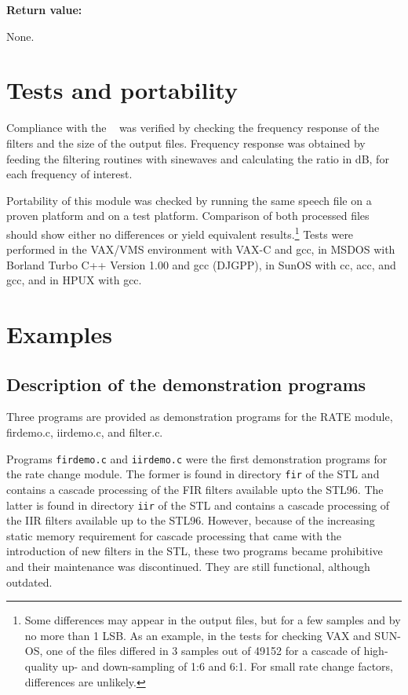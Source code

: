 {\bf Return value: }

None.


\section {Tests and portability} \label{RATE-Tests}

Compliance with the \ROs~ was verified by checking the frequency
response of the filters and the size of the output files. Frequency
response was obtained by feeding the filtering routines with sinewaves
and calculating the ratio in dB, for each frequency of interest.

Portability of this module was checked by running the same speech file
on a proven platform and on a test platform. Comparison of both
processed files should show either no differences or yield equivalent
results.\footnote{\SF Some differences may appear in the output files,
but for a few samples and by no more than 1 LSB. As an example, in the
tests for checking VAX and SUN-OS, one of the files differed in 3
samples out of 49152 for a cascade of high-quality up- and
down-sampling of 1:6 and 6:1. For small rate change factors,
differences are unlikely.} Tests were performed in the VAX/VMS
environment with VAX-C and gcc, in MSDOS with Borland Turbo C++
Version 1.00 and gcc (DJGPP), in SunOS with cc, acc, and gcc, and in
HPUX with gcc.


\section {Examples} \label{Rate-exp}


\subsection {Description of the demonstration programs}

Three programs are provided as demonstration programs for the RATE module,
firdemo.c, iirdemo.c, and filter.c.

Programs {\tt firdemo.c} and {\tt iirdemo.c} were the first demonstration
programs for the rate change module. The former is found in directory
{\tt fir} of the STL and contains a cascade processing of the FIR
filters available upto the STL96. The latter is found in directory
{\tt iir} of the STL and contains a cascade processing of the IIR
filters available up to the STL96. However, because of the increasing
static memory requirement for cascade processing that came with the
introduction of new filters in the STL, these two programs became
prohibitive and their maintenance was discontinued. They are still
functional, although outdated.

